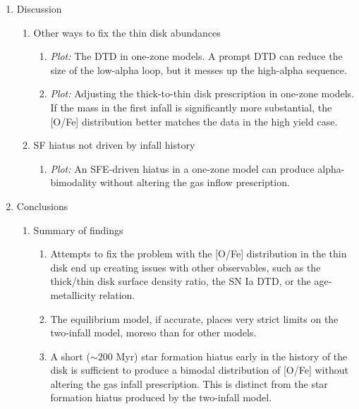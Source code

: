 \begin{enumerate}
    \item Discussion
    \begin{enumerate}
        \item Other ways to fix the thin disk abundances
        \begin{enumerate}
            \item {\it Plot:} The DTD in one-zone models. A prompt DTD can reduce the size of the low-alpha loop, but it messes up the high-alpha sequence.
            \item {\it Plot:} Adjusting the thick-to-thin disk prescription in one-zone models. If the mass in the first infall is significantly more substantial, the [O/Fe] distribution better matches the data in the high yield case.
        \end{enumerate}
        \item SF hiatus not driven by infall history
        \begin{enumerate}
            \item {\it Plot:} An SFE-driven hiatus in a one-zone model can produce alpha-bimodality without altering the gas inflow prescription.
        \end{enumerate}
    \end{enumerate}
    
    \item Conclusions
    \begin{enumerate}
        \item Summary of findings
        \begin{enumerate}
            \item Attempts to fix the problem with the [O/Fe] distribution in the thin disk end up creating issues with other observables, such as the thick/thin disk surface density ratio, the SN Ia DTD, or the age-metallicity relation.
            \item The equilibrium model, if accurate, places very strict limits on the two-infall model, moreso than for other models.
            \item A short ($\sim200$ Myr) star formation hiatus early in the history of the disk is sufficient to produce a bimodal distribution of [O/Fe] without altering the gas infall prescription. This is distinct from the star formation hiatus produced by the two-infall model.
        \end{enumerate}
    \end{enumerate}
\end{enumerate}